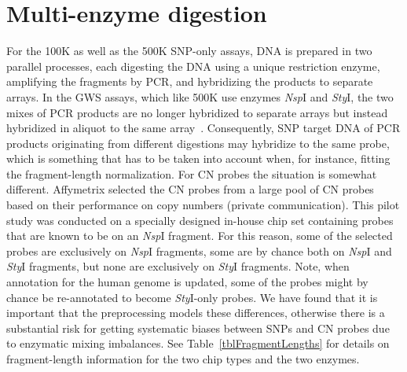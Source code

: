 \documentclass[10pt,a4paper]{article}
\newcommand{\GWSSix}{GWS6\xspace}
\newcommand{\NspI}{\emph{Nsp}I\xspace}
\newcommand{\StyI}{\emph{Sty}I\xspace}
\begin{document}
\clearpage
\section{Multi-enzyme digestion}
\label{secMultiEnzymeDigestion}
For the 100K as well as the 500K SNP-only assays, DNA is prepared in two parallel processes, each digesting the DNA using a unique restriction enzyme, amplifying the fragments by PCR, and hybridizing the products to separate arrays.  In the GWS assays, which like 500K use enzymes \NspI and \StyI, the two mixes of PCR products are no longer hybridized to separate arrays but instead hybridized in aliquot to the same array~\citep{Affymetrix_2007f,Affymetrix_2007g}.
Consequently, SNP target DNA of PCR products originating from different digestions may hybridize to the same probe, which is something that has to be taken into account when, for instance, fitting the fragment-length normalization.
For CN probes the situation is somewhat different.  Affymetrix selected the CN probes from a large pool of CN probes based on their performance on copy numbers (private communication).  This pilot study was conducted on a specially designed in-house chip set containing probes that are known to be on an \NspI fragment.  For this reason, some of the selected probes are exclusively on \NspI fragments, some are by chance both on \NspI and \StyI fragments, but none are exclusively on \StyI fragments.  Note, when annotation for the human genome is updated, some of the probes might by chance be re-annotated to become \StyI-only probes.
We have found that it is important that the preprocessing models these differences, otherwise there is a substantial risk for getting systematic biases between SNPs and CN probes due to enzymatic mixing imbalances.
See Table~\ref{tblFragmentLengths} for details on fragment-length information for the two chip types and the two enzymes.



\clearpage


 
\end{document}
